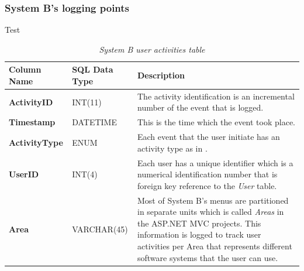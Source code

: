 \clearpage

\subsubsection{System B's logging points}

Test

\begin{table}[!htb]
	\centering
	\small
	\caption[System B user activities table]
	{\textit{System B user activities table}}
	\label{tbl:CH2_SystemB_LoggingTable}
	\begin{tabularx}{\textwidth}{|l|l|X|}
		\hline \textbf{Column Name} & \textbf{SQL Data Type} & \textbf{Description} \\
		\hline \textbf{ActivityID} & INT(11) & The activity identification is an incremental number of the event that is logged.\\
		\hline \textbf{Timestamp} & DATETIME & This is the time which the event took place.\\
		\hline \textbf{ActivityType} & ENUM & Each event that the user initiate has an activity type as in \Cref{tbl:Ch2_SystemB_ActivityTypes}. \\
		\hline \textbf{UserID} & INT(4) & Each user has a unique identifier which is a numerical identification number that is foreign key reference to the \emph{User} table. \\
		\hline \textbf{Area} & VARCHAR(45) & Most of System B's menus are partitioned in separate units which is called \emph{Areas} in the ASP.NET MVC projects. This information is logged to track user activities per Area that represents different software systems that the user can use. \\
		\hline
	\end{tabularx}
\end{table}

